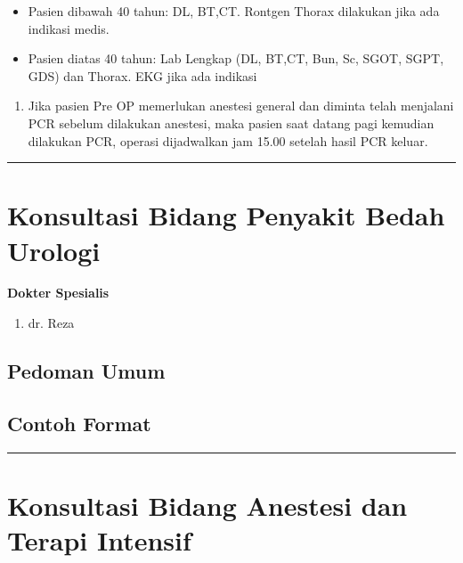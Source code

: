 \documentclass[
]{book}
\providecommand{\tightlist}{%
  \setlength{\itemsep}{0pt}\setlength{\parskip}{0pt}}
\begin{document}
\begin{itemize}
\tightlist
\item
  Pasien dibawah 40 tahun: DL, BT,CT. Rontgen Thorax dilakukan jika ada indikasi medis.
\item
  Pasien diatas 40 tahun: Lab Lengkap (DL, BT,CT, Bun, Sc, SGOT, SGPT, GDS) dan Thorax. EKG jika ada indikasi
\end{itemize}

\begin{enumerate}
\def\labelenumi{\arabic{enumi}.}
\setcounter{enumi}{2}
\tightlist
\item
  Jika pasien Pre OP memerlukan anestesi general dan diminta telah menjalani PCR sebelum dilakukan anestesi, maka pasien saat datang pagi kemudian dilakukan PCR, operasi dijadwalkan jam 15.00 setelah hasil PCR keluar.
\end{enumerate}

\begin{center}\rule{0.5\linewidth}{0.5pt}\end{center}

\hypertarget{konsultasi-bidang-penyakit-bedah-urologi}{%
\section{Konsultasi Bidang Penyakit Bedah Urologi}\label{konsultasi-bidang-penyakit-bedah-urologi}}

\textbf{Dokter Spesialis}

\begin{enumerate}
\def\labelenumi{\arabic{enumi}.}
\tightlist
\item
  dr. Reza
\end{enumerate}

\hypertarget{pedoman-umum-4}{%
\subsection{Pedoman Umum}\label{pedoman-umum-4}}

\hypertarget{contoh-format-4}{%
\subsection{Contoh Format}\label{contoh-format-4}}

\begin{center}\rule{0.5\linewidth}{0.5pt}\end{center}

\hypertarget{konsultasi-bidang-anestesi-dan-terapi-intensif}{%
\section{Konsultasi Bidang Anestesi dan Terapi Intensif}\label{konsultasi-bidang-anestesi-dan-terapi-intensif}}
\end{document}

